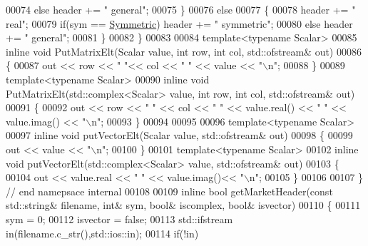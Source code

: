 \begin{DoxyCode}
{00074       \textcolor{keywordflow}{else} header += \textcolor{stringliteral}{" general"};
00075     \}
00076     \textcolor{keywordflow}{else}
00077     \{
00078       header += \textcolor{stringliteral}{" real"}; 
00079       \textcolor{keywordflow}{if}(sym == \hyperlink{group__enums_gga39e3366ff5554d731e7dc8bb642f83cda7d30fb969ef6b763c098f0015108cef4}{Symmetric}) header += \textcolor{stringliteral}{" symmetric"};
00080       \textcolor{keywordflow}{else} header += \textcolor{stringliteral}{" general"};
00081     \}
00082   \}
00083 
00084   \textcolor{keyword}{template}<\textcolor{keyword}{typename} Scalar>
00085   \textcolor{keyword}{inline} \textcolor{keywordtype}{void} PutMatrixElt(Scalar value, \textcolor{keywordtype}{int} row, \textcolor{keywordtype}{int} col, std::ofstream& out)
00086   \{
00087     out << row << \textcolor{stringliteral}{" "}<< col << \textcolor{stringliteral}{" "} << value << \textcolor{stringliteral}{"\(\backslash\)n"};
00088   \}
00089   \textcolor{keyword}{template}<\textcolor{keyword}{typename} Scalar>
00090   \textcolor{keyword}{inline} \textcolor{keywordtype}{void} PutMatrixElt(std::complex<Scalar> value, \textcolor{keywordtype}{int} row, \textcolor{keywordtype}{int} col, std::ofstream& out)
00091   \{
00092     out << row << \textcolor{stringliteral}{" "} << col << \textcolor{stringliteral}{" "} << value.real() << \textcolor{stringliteral}{" "} << value.imag() << \textcolor{stringliteral}{"\(\backslash\)n"};
00093   \}
00094 
00095 
00096   \textcolor{keyword}{template}<\textcolor{keyword}{typename} Scalar>
00097   \textcolor{keyword}{inline} \textcolor{keywordtype}{void} putVectorElt(Scalar value, std::ofstream& out)
00098   \{
00099     out << value << \textcolor{stringliteral}{"\(\backslash\)n"}; 
00100   \}
00101   \textcolor{keyword}{template}<\textcolor{keyword}{typename} Scalar>
00102   \textcolor{keyword}{inline} \textcolor{keywordtype}{void} putVectorElt(std::complex<Scalar> value, std::ofstream& out)
00103   \{
00104     out << value.real << \textcolor{stringliteral}{" "} << value.imag()<< \textcolor{stringliteral}{"\(\backslash\)n"}; 
00105   \}
00106 
00107 \} \textcolor{comment}{// end namepsace internal}
00108 
00109 \textcolor{keyword}{inline} \textcolor{keywordtype}{bool} getMarketHeader(\textcolor{keyword}{const} std::string& filename, \textcolor{keywordtype}{int}& sym, \textcolor{keywordtype}{bool}& iscomplex, \textcolor{keywordtype}{bool}& isvector)
00110 \{
00111   sym = 0; 
00112   isvector = \textcolor{keyword}{false};
00113   std::ifstream in(filename.c\_str(),std::ios::in);
00114   \textcolor{keywordflow}{if}(!in)
}
\end{DoxyCode}
